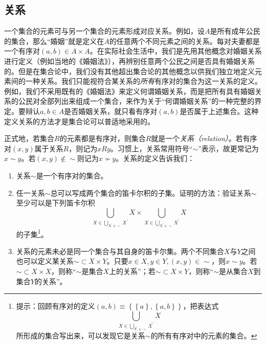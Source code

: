 \documentclass[../main.tex]{subfiles}
\begin{document}
\subsection{关系}
一个集合的元素可与另一个集合的元素形成对应关系。例如，设$A$是所有成年公民的集合，那么“婚姻”就是定义在$A$的任意两个不同元素之间的关系。每对夫妻都是一个有序对$\left(a,b\right)\in A\times A$。在实际社会生活中，我们是先用其他概念对婚姻关系进行定义（例如当地的《婚姻法》），再辨别任意两个公民之间是否具有婚姻关系的。但是在集合论中，我们没有其他超出集合论的其他概念以供我们独立地定义元素间的一种关系。我们只能视符合某关系的\emph{所有}有序对的集合为这一关系的定义。例如，我们不采用既有的《婚姻法》来定义何谓婚姻关系，而是把所有具有婚姻关系的公民对全部列出来组成一个集合，来作为关于“何谓婚姻关系”的一种完整的界定。要辩认$a, b\in A$是否婚姻关系，就只看有序对$\left(a,b\right)$是否属于上述集合。这种定义关系的方法才是集合论可以普适地采用的。

正式地，若集合$R$的元素都是有序对，则集合$R$就是一个\emph{关系（relation）}。若有序对$\left(x,y\right)$属于关系$R$，则记为$xRy$。习惯上，关系常用符号“$\sim$”表示，故更常记为$x\sim y$。若$\left(x,y\right)\notin\sim$则记为$x\not\sim y$。关系的定义告诉我们：

\begin{enumerate}
    \item 关系$\sim$是一个有序对的集合。
    \item 任一关系$\sim$总可以写成两个集合的笛卡尔积的子集。证明的方法：验证关系$\sim$至少可以是下列笛卡尔积
          \[
              \bigcup_{X\in\bigcup_{X^\prime\in\sim}X^\prime}X \times\bigcup_{X\in\bigcup_{X^\prime\in\sim}X^\prime}X
          \]
          的子集\footnote{提示：回顾有序对的定义$\left(a,b\right)\equiv\left\{\left\{a\right\},\left\{a,b\right\}\right\}$，把表达式
              \[
                  \bigcup_{X\in\bigcup_{X^\prime\in\sim}X^\prime}X
              \]
              所形成的集合写出来，可以发现它是关系$\sim$的所有有序对中的元素的集合。}。
    \item 关系的元素未必是同一个集合与其自身的笛卡尔集。两个不同集合$X$与$Y$之间也可以定义某关系$\sim\subset X\times Y$。只要$x\in X,y\in Y,\left(x,y\right)\in\sim$，则$x\sim y$。若$\sim\subset X\times X$，则称“$\sim$是集合$X$上的关系”；若$\sim\subset X\times Y$，则称“$\sim$是从集合$X$到集合$Y$的关系”。
\end{enumerate}
\end{document}
